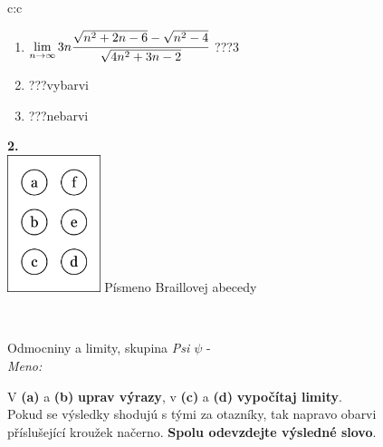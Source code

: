 \documentclass[10pt]{report}
\begin{document}
\begin{tabular}{c:c}
\begin{minipage}[c][104.5mm][t]{0.5\linewidth}
\begin{center}
\begin{minipage}{0.79\linewidth}
\begin{center}
\begin{varwidth}{\linewidth}
\begin{enumerate}
\item $\lim\limits_{n\to\infty}3n\cfrac{\sqrt{n^2+2n-6}-\sqrt{n^2-4}}{\sqrt{4n^2+3n-2}}$\quad \dotfill\; ???\;\dotfill \quad $3$
\item \quad \dotfill\; ???\;\dotfill \quad vybarvi
\item \quad \dotfill\; ???\;\dotfill \quad nebarvi
\end{enumerate}
\end{varwidth}
\end{center}
\end{minipage}
\begin{minipage}{0.20\linewidth}
\begin{center}
{\Huge\bfseries 2.} \\[2mm]
\includegraphics[height=40mm]{../images/braille.png}
{\small Písmeno Braillovej abecedy}
\end{center}
\end{minipage}
\end{center}
\end{minipage}
\\ \hdashline
\begin{minipage}[c][104.5mm][t]{0.5\linewidth}
\begin{center}
\vspace{7mm}
{\huge Odmocniny a limity, skupina \textit{Psi $\psi$} -}\\[5mm]
\textit{Meno:}\phantom{xxxxxxxxxxxxxxxxxxxxxxxxxxxxxxxxxxxxxxxxxxxxxxxxxxxxxxxxxxxxxxxxx}\\[5mm]
\begin{minipage}{0.95\linewidth}
\begin{center}
V \textbf{(a)} a \textbf{(b)} \textbf{uprav výrazy}, v \textbf{(c)} a \textbf{(d)} \textbf{vypočítaj limity}.\\Pokud se výsledky shodujú s tými za otazníky, tak napravo obarvi\\příslušející kroužek načerno. \textbf{Spolu odevzdejte výsledné slovo}.
\end{center}
\end{minipage}
\\[1mm]

\end{center}
\end{minipage}
\end{tabular}
\end{document}
